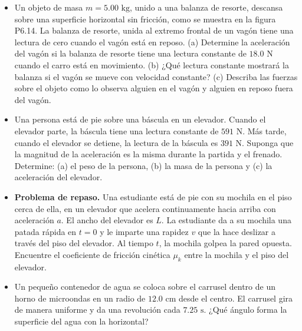 \documentclass[11pt,a4paper]{article}
\begin{document}
\begin{itemize}
    \item[\textbf{14.}] Un objeto de masa $m = 5.00 \text{ kg}$, unido a una balanza de resorte, descansa sobre una superficie horizontal sin fricción, como se muestra en la figura P6.14. La balanza de resorte, unida al extremo frontal de un vagón tiene una lectura de cero cuando el vagón está en reposo. (a) Determine la aceleración del vagón si la balanza de resorte tiene una lectura constante de $18.0 \text{ N}$ cuando el carro está en movimiento. (b) ¿Qué lectura constante mostrará la balanza si el vagón se mueve con velocidad constante? (c) Describa las fuerzas sobre el objeto como lo observa alguien en el vagón y alguien en reposo fuera del vagón.
    \vspace*{7cm}

    \item[\textbf{15.}] Una persona está de pie sobre una báscula en un elevador. Cuando el elevador parte, la báscula tiene una lectura constante de $591 \text{ N}$. Más tarde, cuando el elevador se detiene, la lectura de la báscula es $391 \text{ N}$. Suponga que la magnitud de la aceleración es la misma durante la partida y el frenado. Determine: (a) el peso de la persona, (b) la masa de la persona y (c) la aceleración del elevador.
    \vspace*{7cm}

    \item[\textbf{16.}] \textbf{Problema de repaso.} Una estudiante está de pie con su mochila en el piso cerca de ella, en un elevador que acelera continuamente hacia arriba con aceleración $a$. El ancho del elevador es $L$. La estudiante da a su mochila una patada rápida en $t = 0$ y le imparte una rapidez $v$ que la hace deslizar a través del piso del elevador. Al tiempo $t$, la mochila golpea la pared opuesta. Encuentre el coeficiente de fricción cinética $\mu_k$ entre la mochila y el piso del elevador.
    \vspace*{7cm}

    \item[\textbf{17.}] Un pequeño contenedor de agua se coloca sobre el carrusel dentro de un horno de microondas en un radio de $12.0 \text{ cm}$ desde el centro. El carrusel gira de manera uniforme y da una revolución cada $7.25 \text{ s}$. ¿Qué ángulo forma la superficie del agua con la horizontal?
    \vspace*{6cm}
\end{itemize}

\newpage
\end{document}
